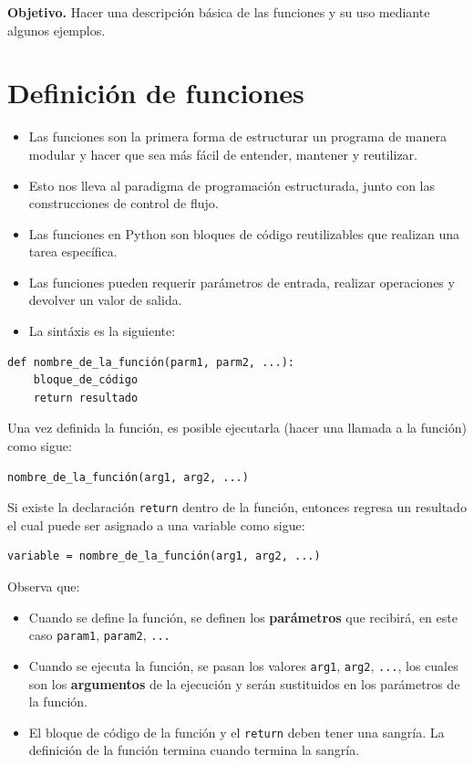\documentclass[
  spanish,
  letterpaper,
]{scrbook}
\providecommand{\tightlist}{%
  \setlength{\itemsep}{0pt}\setlength{\parskip}{0pt}}
\theoremstyle{definition}
\theoremstyle{remark}
\begin{document}
\textbf{Objetivo.} Hacer una descripción básica de las funciones y su
uso mediante algunos ejemplos.

\section{Definición de funciones}\label{definiciuxf3n-de-funciones}

\begin{itemize}
\item
  Las funciones son la primera forma de estructurar un programa de
  manera modular y hacer que sea más fácil de entender, mantener y
  reutilizar.
\item
  Esto nos lleva al paradigma de programación estructurada, junto con
  las construcciones de control de flujo.
\item
  Las funciones en Python son bloques de código reutilizables que
  realizan una tarea específica.
\item
  Las funciones pueden requerir parámetros de entrada, realizar
  operaciones y devolver un valor de salida.
\item
  La sintáxis es la siguiente:
\end{itemize}

\begin{verbatim}
def nombre_de_la_función(parm1, parm2, ...):
    bloque_de_código
    return resultado
\end{verbatim}

Una vez definida la función, es posible ejecutarla (hacer una llamada a
la función) como sigue:

\begin{verbatim}
nombre_de_la_función(arg1, arg2, ...)
\end{verbatim}

Si existe la declaración \texttt{return} dentro de la función, entonces
regresa un resultado el cual puede ser asignado a una variable como
sigue:

\begin{verbatim}
variable = nombre_de_la_función(arg1, arg2, ...)
\end{verbatim}

Observa que:

\begin{itemize}
\tightlist
\item
  Cuando se define la función, se definen los \textbf{parámetros} que
  recibirá, en este caso \texttt{param1}, \texttt{param2}, \texttt{...}
\item
  Cuando se ejecuta la función, se pasan los valores \texttt{arg1},
  \texttt{arg2}, \texttt{...}, los cuales son los \textbf{argumentos} de
  la ejecución y serán sustituidos en los parámetros de la función.
\item
  El bloque de código de la función y el \texttt{return} deben tener una
  sangría. La definición de la función termina cuando termina la
  sangría.
\end{itemize}
\end{document}
